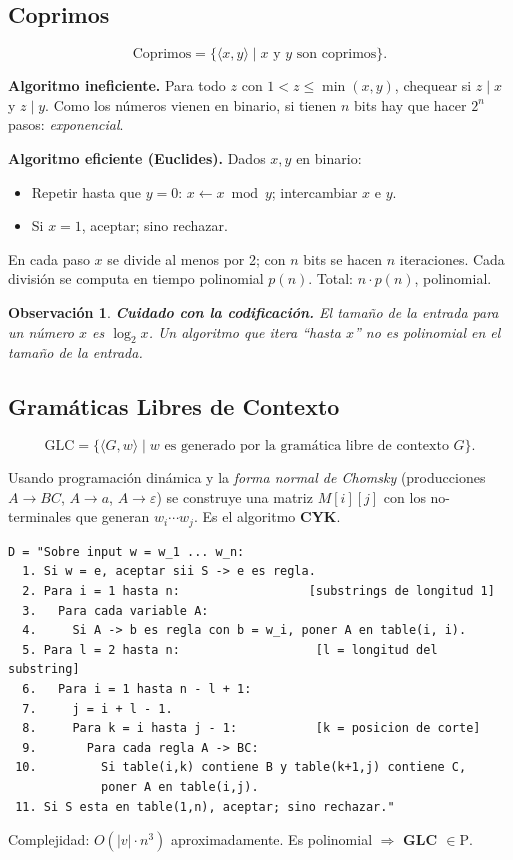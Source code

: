 \documentclass[11pt,a4paper]{article}
\theoremstyle{definicion}
\newtheorem{observacion}[definicion]{Observaci\'on}
\newcommand{\enc}[1]{\langle #1 \rangle}
\newcommand{\Pclass}{\mathrm{P}}
\begin{document}
\subsection{Coprimos}

\[
\mathrm{Coprimos} = \{ \enc{x, y} \mid x \text{ y } y \text{ son coprimos}\}.
\]

\textbf{Algoritmo ineficiente.} Para todo $z$ con $1 < z \leq \min(x, y)$, chequear si $z \mid x$ y $z \mid y$. Como los n\'umeros vienen en binario, si tienen $n$ bits hay que hacer $2^n$ pasos: \emph{exponencial}.

\textbf{Algoritmo eficiente (Euclides).} Dados $x, y$ en binario:
\begin{itemize}
    \item Repetir hasta que $y = 0$: $x \leftarrow x \bmod y$; intercambiar $x$ e $y$.
    \item Si $x = 1$, aceptar; sino rechazar.
\end{itemize}
En cada paso $x$ se divide al menos por 2; con $n$ bits se hacen $n$ iteraciones. Cada divisi\'on se computa en tiempo polinomial $p(n)$. Total: $n \cdot p(n)$, polinomial.

\begin{observacion}
\textbf{Cuidado con la codificaci\'on.} El tama\~no de la entrada para un n\'umero $x$ es $\log_2 x$. Un algoritmo que itera ``hasta $x$'' no es polinomial en el tama\~no de la entrada.
\end{observacion}

\subsection{Gram\'aticas Libres de Contexto}

\[
\mathrm{GLC} = \{ \enc{G, w} \mid w \text{ es generado por la gram\'atica libre de contexto } G\}.
\]

Usando programaci\'on din\'amica y la \emph{forma normal de Chomsky} (producciones $A \to BC$, $A \to a$, $A \to \varepsilon$) se construye una matriz $M[i][j]$ con los no-terminales que generan $w_i \cdots w_j$. Es el algoritmo \textbf{CYK}.

\begin{verbatim}
D = "Sobre input w = w_1 ... w_n:
  1. Si w = e, aceptar sii S -> e es regla.
  2. Para i = 1 hasta n:                  [substrings de longitud 1]
  3.   Para cada variable A:
  4.     Si A -> b es regla con b = w_i, poner A en table(i, i).
  5. Para l = 2 hasta n:                   [l = longitud del substring]
  6.   Para i = 1 hasta n - l + 1:
  7.     j = i + l - 1.
  8.     Para k = i hasta j - 1:           [k = posicion de corte]
  9.       Para cada regla A -> BC:
 10.         Si table(i,k) contiene B y table(k+1,j) contiene C,
             poner A en table(i,j).
 11. Si S esta en table(1,n), aceptar; sino rechazar."
\end{verbatim}
Complejidad: $O(|v| \cdot n^3)$ aproximadamente. Es polinomial $\Rightarrow$ \textbf{GLC $\in \Pclass$}.
\end{document}

